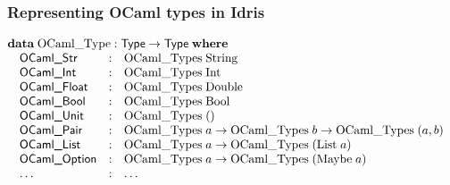 \documentclass[aspectratio=169]{beamer}
\begin{document}
\begin{frame}[t]
  \frametitle{Representing OCaml types in Idris}

  \begin{displaymath}
    \begin{array}{@{}l}
      \textbf{data}\;\mathrm{OCaml\_Type} : \textsf{Type} \to \textsf{Type}\;\textbf{where} \\
      \quad
      \begin{array}{@{}l@{\quad:\quad}l}
        \textsf{OCaml\_Str}   & \mathrm{OCaml\_Types}\;\mathrm{String} \\
        \textsf{OCaml\_Int}   & \mathrm{OCaml\_Types}\;\mathrm{Int} \\
        \textsf{OCaml\_Float} & \mathrm{OCaml\_Types}\;\mathrm{Double} \\
        \textsf{OCaml\_Bool}  & \mathrm{OCaml\_Types}\;\mathrm{Bool}   \\
        \textsf{OCaml\_Unit}  & \mathrm{OCaml\_Types}\;()              \\
        \textsf{OCaml\_Pair}  & \mathrm{OCaml\_Types}\;a \to \mathrm{OCaml\_Types}\;b \to \mathrm{OCaml\_Types}\;(a,b) \\
        \textsf{OCaml\_List}  & \mathrm{OCaml\_Types}\;a \to \mathrm{OCaml\_Types}\;(\mathrm{List}\;a) \\
        \textsf{OCaml\_Option} & \mathrm{OCaml\_Types}\;a \to \mathrm{OCaml\_Types}\;(\mathrm{Maybe}\;a)\\
        \dots & \dots
      \end{array}
    \end{array}
  \end{displaymath}

\end{frame}
\end{document}
